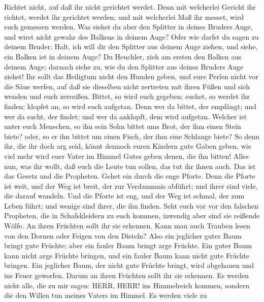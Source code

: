  Richtet nicht, auf daß ihr nicht gerichtet werdet.
 Denn mit welcherlei Gericht ihr richtet, werdet ihr
gerichtet werden; und mit welcherlei Maß ihr messet, wird euch gemessen
werden.  Was siehst du aber den Splitter in deines Bruders
Auge, und wirst nicht gewahr des Balkens in deinem Auge? 
Oder wie darfst du sagen zu deinem Bruder: Halt, ich will dir den
Splitter aus deinem Auge ziehen, und siehe, ein Balken ist in deinem
Auge?  Du Heuchler, zieh am ersten den Balken aus deinem
Auge; darnach siehe zu, wie du den Splitter aus deines Bruders Auge
ziehst!  Ihr sollt das Heiligtum nicht den Hunden geben, und
eure Perlen nicht vor die Säue werfen, auf daß sie dieselben nicht
zertreten mit ihren Füßen und sich wenden und euch zerreißen.
 Bittet, so wird euch gegeben; suchet, so werdet ihr finden;
klopfet an, so wird euch aufgetan.  Denn wer da bittet, der
empfängt; und wer da sucht, der findet; und wer da anklopft, dem wird
aufgetan.  Welcher ist unter euch Menschen, so ihn sein Sohn
bittet ums Brot, der ihm einen Stein biete?  oder, so er
ihn bittet um einen Fisch, der ihm eine Schlange biete?  So
denn ihr, die ihr doch arg seid, könnt dennoch euren Kindern gute Gaben
geben, wie viel mehr wird euer Vater im Himmel Gutes geben denen, die
ihn bitten!  Alles nun, was ihr wollt, daß euch die Leute
tun sollen, das tut ihr ihnen auch. Das ist das Gesetz und die
Propheten.  Gehet ein durch die enge Pforte. Denn die
Pforte ist weit, und der Weg ist breit, der zur Verdammnis abführt; und
ihrer sind viele, die darauf wandeln.  Und die Pforte ist
eng, und der Weg ist schmal, der zum Leben führt; und wenige sind ihrer,
die ihn finden.  Seht euch vor vor den falschen Propheten,
die in Schafskleidern zu euch kommen, inwendig aber sind sie reißende
Wölfe.  An ihren Früchten sollt ihr sie erkennen. Kann man
auch Trauben lesen von den Dornen oder Feigen von den Disteln?
 Also ein jeglicher guter Baum bringt gute Früchte; aber
ein fauler Baum bringt arge Früchte.  Ein guter Baum kann
nicht arge Früchte bringen, und ein fauler Baum kann nicht gute Früchte
bringen.  Ein jeglicher Baum, der nicht gute Früchte
bringt, wird abgehauen und ins Feuer geworfen.  Darum an
ihren Früchten sollt ihr sie erkennen.  Es werden nicht
alle, die zu mir sagen: HERR, HERR! ins Himmelreich kommen, sondern die
den Willen tun meines Vaters im Himmel.  Es werden viele zu
